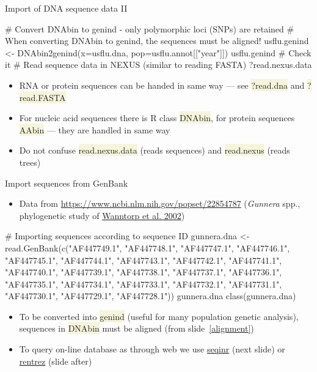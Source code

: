 \documentclass[compress, ucs, xelatex, 11pt, xcolor=svgnames, aspectratio=169,
	hyperref={
		bookmarks=true,
		unicode=true,
		colorlinks=true,
		pdftitle={Molecular data in R},
		plainpages=false,
		pdfauthor={Vojtech Zeisek},
		pdfsubject={Course about phylogeny and evolution in R},
		pdfcreator={XeLaTeX},
		pdfkeywords={R, evolution, phylogeny, molecular data},
		linkcolor=Crimson, %
		anchorcolor=Magenta, %
		citecolor=Magenta, %
		filecolor=Magenta, %
		menucolor=Magenta, %
		urlcolor=DodgerBlue, %
		pdftex},
	url={hyphens, lowtilde} %
	]{beamer}
\renewcommand{\texttt}[1]{\colorbox{Beige}{{\ttfamily #1}}}
\begin{document}
\begin{frame}[fragile]{Import of DNA sequence data II}
	\begin{spluscode}
    # Convert DNAbin to genind - only polymorphic loci (SNPs) are retained
    # When converting DNAbin to genind, the sequences must be aligned!
    usflu.genind <- DNAbin2genind(x=usflu.dna, pop=usflu.annot[["year"]])
    usflu.genind # Check it
    # Read sequence data in NEXUS (similar to reading FASTA)
    ?read.nexus.data
	\end{spluscode}
	\begin{itemize}
		\item RNA or protein sequences can be handed in same way --- see \texttt{?read.dna} and \texttt{?read.FASTA}
		\item For nucleic acid sequences there is R class \texttt{DNAbin}, for protein sequences \texttt{AAbin} --- they are handled in same way
		\item Do not confuse \texttt{read.nexus.data} (reads sequences) and \texttt{read.nexus} (reads trees)
	\end{itemize}
\end{frame}

\begin{frame}[fragile]{Import sequences from GenBank}
	\begin{itemize}
		\item Data from \url{https://www.ncbi.nlm.nih.gov/popset/22854787} (\textit{Gunnera} spp., phylogenetic study of \href{https://bioone.org/journals/systematic-botany/volume-27/issue-3/0363-6445-27.3.512/Phylogenetic-Relationships-of-Gunnera-based-on-Nuclear-Ribosomal-DNA-ITS/10.1043/0363-6445-27.3.512.full}{Wanntorp et al. 2002})
	\end{itemize}
	\begin{spluscode}
    # Importing sequences according to sequence ID
    gunnera.dna <- read.GenBank(c("AF447749.1", "AF447748.1", "AF447747.1",
      "AF447746.1", "AF447745.1", "AF447744.1", "AF447743.1", "AF447742.1",
      "AF447741.1", "AF447740.1", "AF447739.1", "AF447738.1", "AF447737.1",
      "AF447736.1", "AF447735.1", "AF447734.1", "AF447733.1", "AF447732.1",
      "AF447731.1", "AF447730.1", "AF447729.1", "AF447728.1"))
    gunnera.dna
    class(gunnera.dna)
	\end{spluscode}
	\begin{itemize}
		\item To be converted into \texttt{genind} (useful for many population genetic analysis), sequences in \texttt{DNAbin} must be aligned (from slide~\ref{alignment})
		\item To query on-line database as through web we use \href{https://CRAN.R-project.org/package=seqinr}{seqinr} (next slide) or \href{https://CRAN.R-project.org/package=rentrez}{rentrez} (slide after)
	\end{itemize}
\end{frame}
\end{document}
